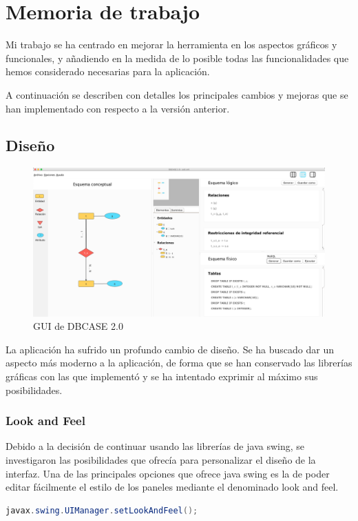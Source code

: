 \chapter{Memoria de trabajo}
Mi trabajo se ha centrado en mejorar la herramienta en los aspectos gráficos y funcionales, y añadiendo en la medida de lo posible todas las funcionalidades que hemos considerado necesarias para la aplicación.

A continuación se describen con detalles los principales cambios y mejoras que se han implementado con respecto a la versión anterior.
\section{Diseño}
\begin{figure}[H]
    \centering
    \includegraphics[width=\textwidth]{img/GUI_DBCASE.png}
    \caption{GUI de DBCASE 2.0}
\end{figure}
La aplicación ha sufrido un profundo cambio de diseño. Se ha buscado dar un aspecto más moderno a la aplicación, de forma que se han conservado las librerías gráficas con las que implementó y se ha intentado exprimir al máximo sus posibilidades.\\

\subsection{Look and Feel}
Debido a la decisión de continuar usando las librerías de java swing, se investigaron las posibilidades que ofrecía para personalizar el diseño de la interfaz. Una de las principales opciones que ofrece java swing es la de poder editar fácilmente el estilo de los paneles mediante el denominado look and feel.

\begin{lstlisting}[backgroundcolor = \color{white},
                   xleftmargin = 2cm,language=java,basicstyle=\medium]
javax.swing.UIManager.setLookAndFeel();
\end{lstlisting}

